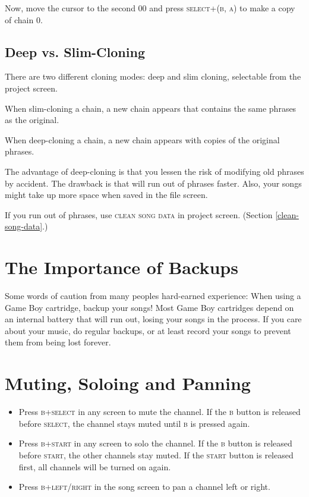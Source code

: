 Now, move the cursor to the second 00 and press \textsc{select+(b, a)} to make a copy of chain 0.

\subsection{Deep vs. Slim-Cloning}

There are two different cloning modes: deep and slim cloning, selectable from the project screen.

When slim-cloning a chain, a new chain appears that contains the same phrases as the original.

When deep-cloning a chain, a new chain appears with copies of the original phrases.

The advantage of deep-cloning is that you lessen the risk of modifying old phrases by accident.
The drawback is that will run out of phrases faster.
Also, your songs might take up more space when saved in the file screen.

If you run out of phrases, use \textsc{clean song data} in project screen. (Section \ref{clean-song-data}.)

\section{The Importance of Backups}

Some words of caution from many peoples hard-earned experience: When using a Game Boy cartridge, backup your songs! Most Game Boy cartridges depend on an internal battery that will run out, losing your songs in the process. If you care about your music, do regular backups, or at least record your songs to prevent them from being lost forever.

\section{Muting, Soloing and Panning}

\begin{itemize}
\item Press \textsc{b+select} in any screen to mute the channel. If the \textsc{b} button is released before \textsc{select}, the channel stays muted until \textsc{b} is pressed again.
\item Press \textsc{b+start} in any screen to solo the channel. If the \textsc{b} button is released before \textsc{start}, the other channels stay muted. If the \textsc{start} button is released first, all channels will be turned on again.
\item Press \textsc{b+left/right} in the song screen to pan a channel left or right.
\end{itemize}

